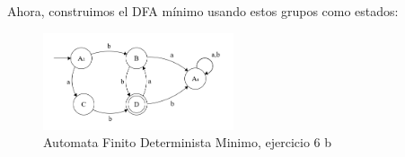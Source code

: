     Ahora, construimos el DFA mínimo usando estos grupos como estados:
    \begin{figure}[h]
        \centering
        \includegraphics[width=0.5\textwidth]{images/6bresuelto.png}
        \caption{Automata Finito Determinista Minimo, ejercicio 6 b}
    \end{figure}
